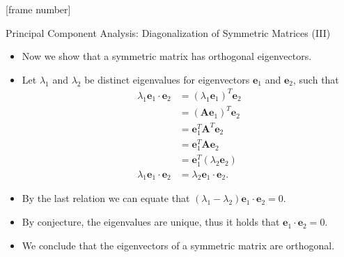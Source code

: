 \documentclass[aspectratio=169,t]{beamer}
\begin{document}
  {
    [frame number]
    \begin{frame}{Principal Component Analysis: Diagonalization of Symmetric Matrices (III)}
    \begin{itemize}
      \item Now we show that a symmetric matrix has orthogonal eigenvectors.
      \item Let $\lambda_1$ and $\lambda_2$ be distinct eigenvalues for eigenvectors $\mathbf{e}_1$ and $\mathbf{e}_2$, such that
      \begin{align}
        \lambda_1\mathbf{e}_1 \cdot \mathbf{e}_2 &= (\lambda_1 \mathbf{e}_1)^{T} \mathbf{e}_2 \\
        &= (\mathbf{Ae}_1)^{T}\mathbf{e}_2 \\
        &= \mathbf{e}_1^T \mathbf{A}^T \mathbf{e}_2 \\
        &= \mathbf{e}_1^T \mathbf{A}\mathbf{e}_2 \\
        &= \mathbf{e}_1^T (\lambda_2 \mathbf{e}_2) \\
        \lambda_1\mathbf{e}_1 \cdot \mathbf{e}_2 &= \lambda_2 \mathbf{e}_1 \cdot \mathbf{e}_2.
      \end{align}
      \item By the last relation we can equate that $(\lambda_1 - \lambda_2) \mathbf{e}_1 \cdot \mathbf{e}_2 = 0$.
      \item By conjecture, the eigenvalues are unique, thus it holds that $\mathbf{e}_1 \cdot \mathbf{e}_2 = 0$.
      \item We conclude that the eigenvectors of a symmetric matrix are orthogonal.
    \end{itemize}
    \end{frame}
  }
\end{document}

